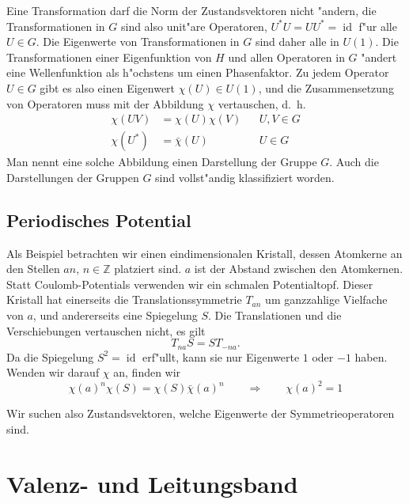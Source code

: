 Eine Transformation darf die Norm der Zustandsvektoren nicht "andern,
die Transformationen in $G$ sind also unit"are Operatoren,
$U^*U=UU^*=\operatorname{id}$ f"ur alle $U\in G$.
Die Eigenwerte von Transformationen in $G$ sind daher alle in $U(1)$.
Die Transformationen einer Eigenfunktion von $H$ und allen Operatoren in $G$
"andert eine Wellenfunktion als h"ochstens um einen Phasenfaktor.
Zu jedem Operator $U\in G$ gibt es also einen Eigenwert $\chi(U)\in U(1)$,
und die Zusammensetzung von Operatoren muss mit der Abbildung $\chi$
vertauschen, d.~h.
\[
\begin{aligned}
\chi(UV)&=\chi(U)\chi(V)&&U,V\in G\\
\chi(U^*)&=\bar\chi(U)&&U\in G
\end{aligned}
\]
Man nennt eine solche Abbildung einen Darstellung der Gruppe $G$.
Auch die Darstellungen der Gruppen $G$ sind vollst"andig klassifiziert
worden.

\subsection{Periodisches Potential}
Als Beispiel betrachten wir einen eindimensionalen Kristall, dessen
Atomkerne an den Stellen $an$, $n\in\mathbb Z$ platziert sind.
$a$ ist der Abstand zwischen den Atomkernen.
Statt Coulomb-Potentials verwenden wir ein schmalen Potentialtopf.
Dieser Kristall hat einerseits die Translationssymmetrie $T_{an}$ um
ganzzahlige Vielfache von $a$, und andererseits eine Spiegelung $S$.
Die Translationen und die Verschiebungen vertauschen nicht, es gilt
\[
T_{na}S=ST_{-na}.
\]
Da die Spiegelung $S^2=\operatorname{id}$ erf"ullt, kann sie nur
Eigenwerte $1$ oder $-1$ haben.
Wenden wir darauf $\chi$ an, finden wir
\[
\chi(a)^n\chi(S)=\chi(S)\bar\chi(a)^n
\qquad \Rightarrow \qquad
\chi(a)^2=1
\]

Wir suchen also Zustandsvektoren, welche Eigenwerte der
Symmetrieoperatoren sind.

\section{Valenz- und Leitungsband}



